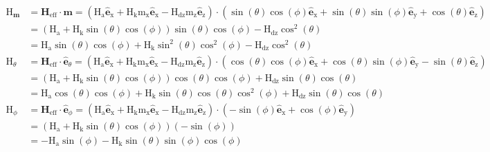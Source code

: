 \documentclass[reprint,amsmath,amssymb,aps, floatfix]{revtex4-2}
\begin{document}
\begin{widetext}
\begin{equation}
    \begin{aligned}
        \text{H}_{\mathbf{m}} & = \mathbf{H}_{\text{eff}} \cdot \mathbf{m} = \left(\text{H}_{\text{a}}\hat{\mathbf{e}}_{\text{x}}+\text{H}_{\text{k}}\text{m}_{\text{x}}\hat{\mathbf{e}}_{\text{x}}-\text{H}_{\text{dz}}\text{m}_{\text{z}}\hat{\mathbf{e}}_{\text{z}}\right) \cdot \left(\sin(\theta)\cos(\phi)\hat{\mathbf{e}}_{\text{x}} + \sin(\theta)\sin(\phi)\hat{\mathbf{e}}_{\text{y}} + \cos(\theta)\hat{\mathbf{e}}_{\text{z}}\right) \\[1ex]
        & = \left(\text{H}_{\text{a}}+\text{H}_{\text{k}}\sin(\theta)\cos(\phi)\right)\sin(\theta)\cos(\phi)-\text{H}_{\text{dz}}\cos^2(\theta) \\[1ex]
        & = \text{H}_{\text{a}}\sin(\theta)\cos(\phi)+\text{H}_{\text{k}}\sin^2(\theta)\cos^2(\phi)-\text{H}_{\text{dz}}\cos^2(\theta) \\[2ex]
        \text{H}_{\theta} & = \mathbf{H}_{\text{eff}} \cdot \hat{\mathbf{e}}_{\theta} = \left(\text{H}_{\text{a}}\hat{\mathbf{e}}_{\text{x}}+\text{H}_{\text{k}}\text{m}_{\text{x}}\hat{\mathbf{e}}_{\text{x}}-\text{H}_{\text{dz}}\text{m}_{\text{z}}\hat{\mathbf{e}}_{\text{z}}\right) \cdot \left(\cos(\theta)\cos(\phi)\hat{\mathbf{e}}_{\text{x}}+\cos(\theta)\sin(\phi)\hat{\mathbf{e}}_{\text{y}}-\sin(\theta)\hat{\mathbf{e}}_{\text{z}}\right) \\[1ex]
        & = \left(\text{H}_{\text{a}}+\text{H}_{\text{k}}\sin(\theta)\cos(\phi)\right)\cos(\theta)\cos(\phi)+\text{H}_{\text{dz}}\sin(\theta)\cos(\theta) \\[1ex]
        & = \text{H}_{\text{a}}\cos(\theta)\cos(\phi)+\text{H}_{\text{k}}\sin(\theta)\cos(\theta)\cos^2(\phi)+\text{H}_{\text{dz}}\sin(\theta)\cos(\theta) \\[2ex]
        \text{H}_{\phi} & = \mathbf{H}_{\text{eff}} \cdot \hat{\mathbf{e}}_{\phi} = \left(\text{H}_{\text{a}}\hat{\mathbf{e}}_{\text{x}}+\text{H}_{\text{k}}\text{m}_{\text{x}}\hat{\mathbf{e}}_{\text{x}}-\text{H}_{\text{dz}}\text{m}_{\text{z}}\hat{\mathbf{e}}_{\text{z}}\right) \cdot \left(-\sin(\phi)\hat{\mathbf{e}}_{\text{x}}+\cos(\phi)\hat{\mathbf{e}}_{\text{y}}\right) \\[1ex]
        & = \left(\text{H}_{\text{a}} + \text{H}_{\text{k}}\sin(\theta)\cos(\phi)\right)\left(-\sin(\phi)\right) \\[1ex]
        & = -\text{H}_{\text{a}}\sin(\phi) - \text{H}_{\text{k}}\sin(\theta)\sin(\phi)\cos(\phi)
    \end{aligned}
    \label{equ:fieldcomponents}
\end{equation}


\end{widetext}
\end{document}
